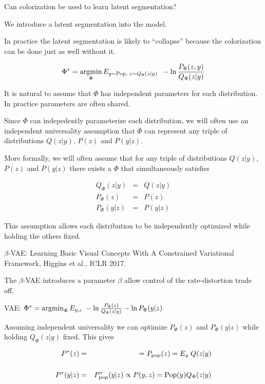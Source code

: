 {\vfill
Can colorization be used to learn latent segmentation?

\vfill
We introduce a latent segmentation into the model.

\vfill
In practice the latent segmentation is likely to ``collapse'' because the colorization can be done just as well without it.



$$\Phi^* = \operatorname*{argmin}_\Phi E_{y\sim \mathrm{Pop},\;z \sim Q_\Phi(z|y)}\;\;-\ln \frac{P_\Phi(z,y)}{Q_\Phi(z|y)}$$

\vfill
It is natural to assume  that $\Phi$ has independent parameters for each distribution.  In practice parameters are often shared.

\vfill
Since $\Phi$ can indepedently parameterize each distribution, we will often use an independent universality assumption
that $\Phi$ can represent any triple of distributions $Q(z|y)$, $P(z)$ and $P(y|z)$.



More formally, we will often assume that for any triple of distributions $Q(z|y)$, $P(z)$ and $P(y|z)$ there exists a $\Phi$ that {\color{red} simultaneously} satisfies

\begin{eqnarray*}
Q_\Phi(z|y) & = & Q(z|y) \\
P_\Phi(z) & = & P(z) \\
P_\Phi(y|z) & = & P(y|z)
\end{eqnarray*}

\vfill
This assumption allows each distribution to be independently optimized while holding the others fixed.


$\beta$-VAE: Learning Basic Visual Concepts With A
Constrained Variational Framework, Higgins et al., ICLR 2017.

\vfill
The $\beta$-VAE introduces a parameter $\beta$ allow control of the rate-distortion trade off.


VAE: $\Phi^* = \operatorname*{argmin}_\Phi E_{y,\epsilon}\;-\ln \frac{P_\Phi(z)}{Q_\Phi(z|y)} - \ln P_\Phi(y|z)$

\vfill
Assuming independent universality we can optimize $P_\Phi(z)$ and $P_\Phi(y|z)$ while holding $Q_\Phi(z|y)$ fixed.
This gives

\begin{eqnarray*}
P^*(z) & = & = P_{\mathrm{pop}}(z) = E_y \;Q(z|y) \\
\\
P^*(y|z) & = & P^*_{\mathrm{pop}}(y|z) \propto P(y,z) = \mathrm{Pop}(y)Q_\Phi(z|y)
\end{eqnarray*}

}
